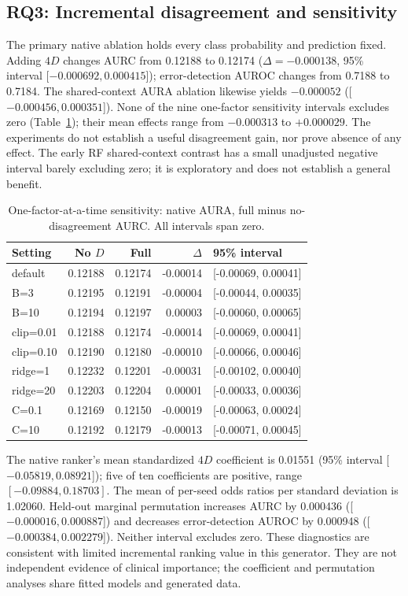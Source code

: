 \documentclass[conference]{IEEEtran}
\begin{document}
\subsection{RQ3: Incremental disagreement and sensitivity}
The primary native ablation holds every class probability and prediction fixed. Adding $4D$ changes AURC from 0.12188 to 0.12174 ($\Delta=-0.000138$, 95\% interval [$-0.000692,0.000415$]); error-detection AUROC changes from 0.7188 to 0.7184. The shared-context AURA ablation likewise yields $-0.000052$ ([$-0.000456,0.000351$]). None of the nine one-factor sensitivity intervals excludes zero (Table~\ref{tab:sens}); their mean effects range from $-0.000313$ to $+0.000029$. The experiments do not establish a useful disagreement gain, nor prove absence of any effect. The early RF shared-context contrast has a small unadjusted negative interval barely excluding zero; it is exploratory and does not establish a general benefit.
\begin{table}[t]
\caption{One-factor-at-a-time sensitivity: native AURA, full minus no-disagreement AURC. All intervals span zero.}
\label{tab:sens}
\centering\footnotesize
\begin{tabular}{@{}lrrrl@{}}\toprule
Setting & No $D$ & Full & $\Delta$ & 95\% interval\\\midrule
default & 0.12188 & 0.12174 & -0.00014 & [-0.00069, 0.00041]\\
B=3 & 0.12195 & 0.12191 & -0.00004 & [-0.00044, 0.00035]\\
B=10 & 0.12194 & 0.12197 & 0.00003 & [-0.00060, 0.00065]\\
clip=0.01 & 0.12188 & 0.12174 & -0.00014 & [-0.00069, 0.00041]\\
clip=0.10 & 0.12190 & 0.12180 & -0.00010 & [-0.00066, 0.00046]\\
ridge=1 & 0.12232 & 0.12201 & -0.00031 & [-0.00102, 0.00040]\\
ridge=20 & 0.12203 & 0.12204 & 0.00001 & [-0.00033, 0.00036]\\
C=0.1 & 0.12169 & 0.12150 & -0.00019 & [-0.00063, 0.00024]\\
C=10 & 0.12192 & 0.12179 & -0.00013 & [-0.00071, 0.00045]\\\bottomrule
\end{tabular}
\end{table}
The native ranker's mean standardized $4D$ coefficient is 0.01551 (95\% interval [$-0.05819,0.08921$]); five of ten coefficients are positive, range $[-0.09884,0.18703]$. The mean of per-seed odds ratios per standard deviation is 1.02060. Held-out marginal permutation increases AURC by 0.000436 ([$-0.000016,0.000887$]) and decreases error-detection AUROC by 0.000948 ([$-0.000384,0.002279$]). Neither interval excludes zero. These diagnostics are consistent with limited incremental ranking value in this generator. They are not independent evidence of clinical importance; the coefficient and permutation analyses share fitted models and generated data.
\end{document}
